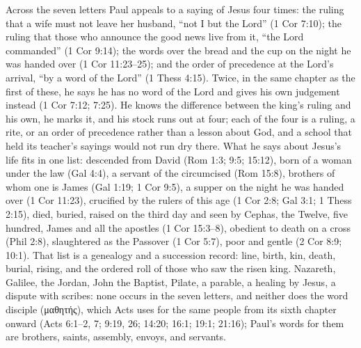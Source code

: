 Across the seven letters Paul appeals to a saying of Jesus four times: the ruling that a wife must not leave her husband, ``not I but the Lord'' (1 Cor 7:10); the ruling that those who announce the good news live from it, ``the Lord commanded'' (1 Cor 9:14); the words over the bread and the cup on the night he was handed over (1 Cor 11:23--25); and the order of precedence at the Lord's arrival, ``by a word of the Lord'' (1 Thess 4:15).
Twice, in the same chapter as the first of these, he says he has no word of the Lord and gives his own judgement instead (1 Cor 7:12; 7:25).
He knows the difference between the king's ruling and his own, he marks it, and his stock runs out at four; each of the four is a ruling, a rite, or an order of precedence rather than a lesson about God, and a school that held its teacher's sayings would not run dry there.
What he says about Jesus's life fits in one list: descended from David (Rom 1:3; 9:5; 15:12), born of a woman under the law (Gal 4:4), a servant of the circumcised (Rom 15:8), brothers of whom one is James (Gal 1:19; 1 Cor 9:5), a supper on the night he was handed over (1 Cor 11:23), crucified by the rulers of this age (1 Cor 2:8; Gal 3:1; 1 Thess 2:15), died, buried, raised on the third day and seen by Cephas, the Twelve, five hundred, James and all the apostles (1 Cor 15:3--8), obedient to death on a cross (Phil 2:8), slaughtered as the Passover (1 Cor 5:7), poor and gentle (2 Cor 8:9; 10:1).
That list is a genealogy and a succession record: line, birth, kin, death, burial, rising, and the ordered roll of those who saw the risen king.
Nazareth, Galilee, the Jordan, John the Baptist, Pilate, a parable, a healing by Jesus, a dispute with scribes: none occurs in the seven letters, and neither does the word disciple (μαθητής), which Acts uses for the same people from its sixth chapter onward (Acts 6:1--2, 7; 9:19, 26; 14:20; 16:1; 19:1; 21:16); Paul's words for them are brothers, saints, assembly, envoys, and servants.

